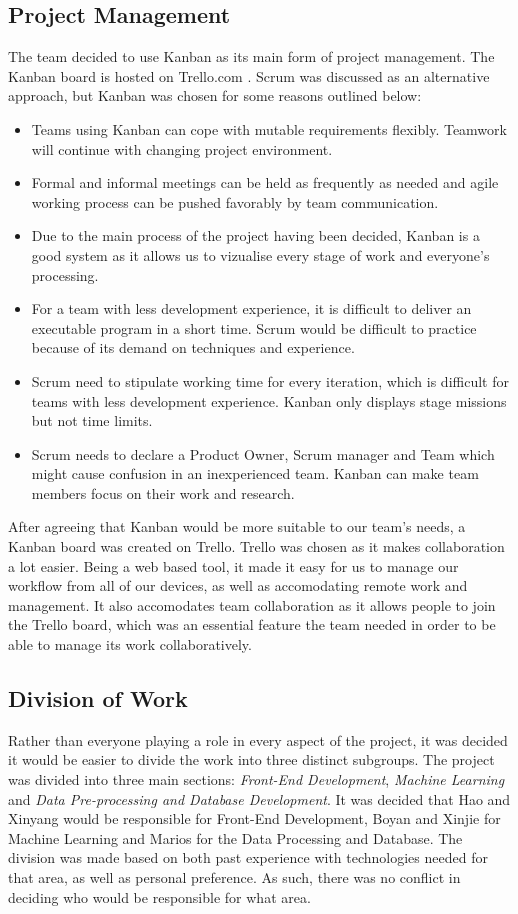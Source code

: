 \documentclass[a4paper,titlepage]{article}
\begin{document}
\subsection{Project Management}
The team decided to use Kanban as its main form of project management. The Kanban board is hosted on Trello.com \cite{trello}. 
Scrum was discussed as an alternative approach, but Kanban was chosen for some reasons outlined below:

\begin{itemize}
\item Teams using Kanban can cope with mutable requirements flexibly. Teamwork will continue with changing project environment.
\item Formal and informal meetings can be held as frequently as needed and agile working process can be pushed favorably by team communication.
\item Due to the main process of the project having been decided, Kanban is a good system as it allows us to vizualise every stage of work and everyone’s processing.
\item For a team with less development experience, it is difficult to deliver an executable program in a short time. Scrum would be difficult to practice because of its demand on techniques and experience.
\item Scrum need to stipulate working time for every iteration, which is difficult for teams with less development experience. Kanban only displays stage missions but not time limits.
\item Scrum needs to declare a Product Owner, Scrum manager and Team which might cause confusion in an inexperienced team. Kanban can make team members focus on their work and research.
\end{itemize}

After agreeing that Kanban would be more suitable to our team's needs, a Kanban board was created on Trello. Trello was chosen as it makes collaboration a lot easier. 
Being a web based tool, it made it easy for us to manage our workflow from all of our devices, as well as accomodating remote work and management. 
It also accomodates team collaboration as it allows people to join the Trello board, which was an essential feature the team needed in order to be able to manage its work collaboratively.

\subsection{Division of Work\label{work_division}}
Rather than everyone playing a role in every aspect of the project, it was decided it would be easier to divide the work into three distinct subgroups. 
The project was divided into three main sections: \textit{Front-End Development}, \textit{Machine Learning} and \textit{Data Pre-processing and Database Development}. 
It was decided that Hao and Xinyang would be responsible for Front-End Development, Boyan and Xinjie for Machine Learning and Marios for the Data Processing and Database. 
The division was made based on both past experience with technologies needed for that area, as well as personal preference. 
As such, there was no conflict in deciding who would be responsible for what area.
\end{document}
